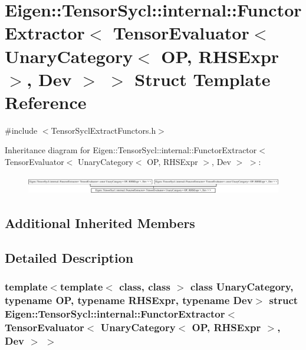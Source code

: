 \hypertarget{struct_eigen_1_1_tensor_sycl_1_1internal_1_1_functor_extractor_3_01_tensor_evaluator_3_01_unary_c1b2699d0091df11d376798d14bae48b}{}\section{Eigen\+:\+:Tensor\+Sycl\+:\+:internal\+:\+:Functor\+Extractor$<$ Tensor\+Evaluator$<$ Unary\+Category$<$ OP, R\+H\+S\+Expr $>$, Dev $>$ $>$ Struct Template Reference}
\label{struct_eigen_1_1_tensor_sycl_1_1internal_1_1_functor_extractor_3_01_tensor_evaluator_3_01_unary_c1b2699d0091df11d376798d14bae48b}


{\ttfamily \#include $<$Tensor\+Sycl\+Extract\+Functors.\+h$>$}

Inheritance diagram for Eigen\+:\+:Tensor\+Sycl\+:\+:internal\+:\+:Functor\+Extractor$<$ Tensor\+Evaluator$<$ Unary\+Category$<$ OP, R\+H\+S\+Expr $>$, Dev $>$ $>$\+:\begin{figure}[H]
\begin{center}
\leavevmode
\includegraphics[height=0.839580cm]{struct_eigen_1_1_tensor_sycl_1_1internal_1_1_functor_extractor_3_01_tensor_evaluator_3_01_unary_c1b2699d0091df11d376798d14bae48b}
\end{center}
\end{figure}
\subsection*{Additional Inherited Members}


\subsection{Detailed Description}
\subsubsection*{template$<$template$<$ class, class $>$ class Unary\+Category, typename OP, typename R\+H\+S\+Expr, typename Dev$>$\newline
struct Eigen\+::\+Tensor\+Sycl\+::internal\+::\+Functor\+Extractor$<$ Tensor\+Evaluator$<$ Unary\+Category$<$ O\+P, R\+H\+S\+Expr $>$, Dev $>$ $>$}

